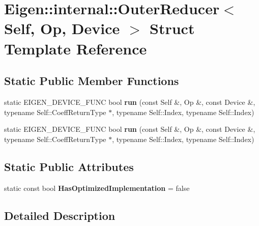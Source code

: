 \hypertarget{struct_eigen_1_1internal_1_1_outer_reducer}{}\section{Eigen\+:\+:internal\+:\+:Outer\+Reducer$<$ Self, Op, Device $>$ Struct Template Reference}
\label{struct_eigen_1_1internal_1_1_outer_reducer}
\subsection*{Static Public Member Functions}
\begin{DoxyCompactItemize}
\item 
\mbox{\label{struct_eigen_1_1internal_1_1_outer_reducer_a8136f58f94804c6134d1c4162c61820d}} 
static E\+I\+G\+E\+N\+\_\+\+D\+E\+V\+I\+C\+E\+\_\+\+F\+U\+NC bool {\bfseries run} (const Self \&, Op \&, const Device \&, typename Self\+::\+Coeff\+Return\+Type $\ast$, typename Self\+::\+Index, typename Self\+::\+Index)
\item 
\mbox{\label{struct_eigen_1_1internal_1_1_outer_reducer_a8136f58f94804c6134d1c4162c61820d}} 
static E\+I\+G\+E\+N\+\_\+\+D\+E\+V\+I\+C\+E\+\_\+\+F\+U\+NC bool {\bfseries run} (const Self \&, Op \&, const Device \&, typename Self\+::\+Coeff\+Return\+Type $\ast$, typename Self\+::\+Index, typename Self\+::\+Index)
\end{DoxyCompactItemize}
\subsection*{Static Public Attributes}
\begin{DoxyCompactItemize}
\item 
\mbox{\label{struct_eigen_1_1internal_1_1_outer_reducer_a1134f5a5ce62a97321e4b62686c5edfb}} 
static const bool {\bfseries Has\+Optimized\+Implementation} = false
\end{DoxyCompactItemize}


\subsection{Detailed Description}
